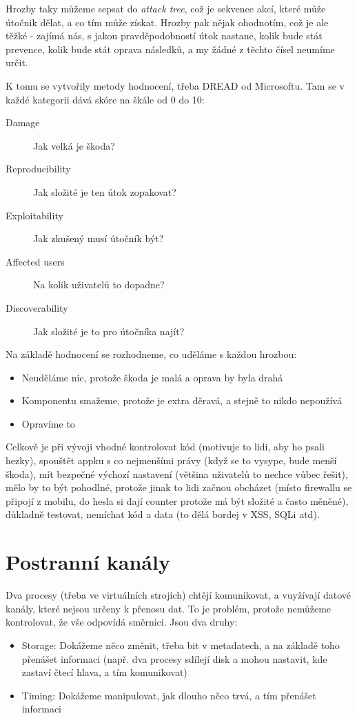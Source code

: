 Hrozby taky můžeme sepsat do \textit{attack tree}, což je sekvence akcí, které může útočnik dělat, a co tím může získat. Hrozby pak nějak ohodnotím, což je ale těžké - zajímá nás, s jakou pravděpodobností útok nastane, kolik bude stát prevence, kolik bude stát oprava následků, a my žádné z těchto čísel neumíme určit.

K tomu se vytvořily metody hodnocení, třeba DREAD od Microsoftu. Tam se v každé kategorii dává skóre na škále od 0 do 10:
\begin{description}
\item[Damage] Jak velká je škoda?
\item[Reproducibility] Jak složité je ten útok zopakovat?
\item[Exploitability] Jak zkušený musí útočník být?
\item[Affected users] Na kolik uživatelů to dopadne?
\item[Discoverability] Jak složité je to pro útočníka najít?
\end{description}

\noindent Na základě hodnocení se rozhodneme, co uděláme s každou hrozbou:
\begin{itemize}
\item Neuděláme nic, protože škoda je malá a oprava by byla drahá
\item Komponentu smažeme, protože je extra děravá, a stejně to nikdo nepoužívá
\item Opravíme to
\end{itemize}

Celkově je při vývoji vhodné kontrolovat kód (motivuje to lidi, aby ho psali hezky), spouštět appku s co nejmenšími právy (když se to vysype, bude menší škoda), mít bezpečné výchozí nastavení (většina uživatelů to nechce vůbec řešit), mělo by to být pohodlné, protože jinak to lidi začnou obcházet (místo firewallu se připojí z mobilu, do hesla si dají counter protože má být složité a často měněné), důkladně testovat, nemíchat kód a data (to dělá bordej v XSS, SQLi atd).



\section{Postranní kanály}

Dva procesy (třeba ve virtuálních strojích) chtějí komunikovat, a vuyžívají datové kanály, které nejsou určeny k přenosu dat. To je problém, protože nemůžeme kontrolovat, že vše odpovídá směrnici. Jsou dva druhy:
\begin{itemize}
\item Storage: Dokážeme něco změnit, třeba bit v metadatech, a na základě toho přenášet informaci (např. dva procesy sdílejí disk a mohou nastavit, kde zastaví čtecí hlava, a tím komunikovat)
\item Timing: Dokážeme manipulovat, jak dlouho něco trvá, a tím přenášet informaci 
\end{itemize}

